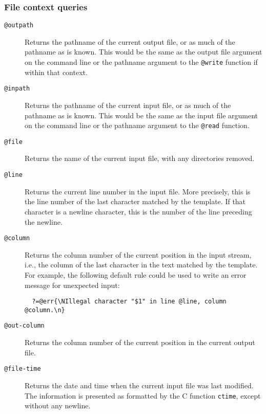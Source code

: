 \subsubsection{File context queries}
\begin{description}

\item[{\tt @outpath\ttlb\ttrb}]
Returns the pathname of the current output file, or as much of the
pathname as is known.  This would be the same as the output file
argument on the command line or the pathname argument to the
\verb/@write/ function if within that context.

\item[{\tt @inpath\ttlb\ttrb}]
Returns the pathname of the current input file, or as much of
the pathname as is known.  This would be the same as the input file
argument on the command line or the pathname argument to the
\verb/@read/ function.

\item[{\tt @file\ttlb\ttrb}]
Returns the name of the current input file, with any directories removed.

\item[{\tt @line\ttlb\ttrb}]
Returns the current line number in the input file.
More precisely, this is the line number of the last character matched by
the template.  If that character is a newline character, this is the
number of the line preceding the newline.

\item[{\tt @column\ttlb\ttrb}]
Returns the column number of the current position in the input stream,
i.e., the column of the last character in the text matched by the
template.
For example, the following default rule could be used to write an error
message for unexpected input:
\begin{verbatim}
  ?=@err{\NIllegal character "$1" in line @line, column @column.\n}
\end{verbatim}

\item[{\tt @out-column\ttlb\ttrb}]
Returns the column number of the current position in the current output
file.

\item[{\tt @file-time\ttlb\ttrb}]
Returns the date and time when the current input file was last modified.
The information is presented as formatted by the C function
{\tt ctime}, except without any newline.
\end{description}

\pagebreak[3]
